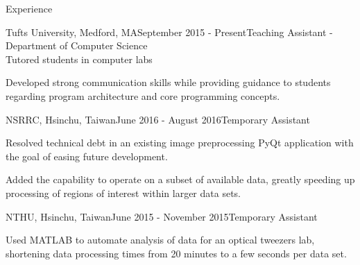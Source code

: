 \documentclass{resume} %
\begin{document}

\bigskip
\bigskip
\bigskip

\begin{rSection}{Experience}


\begin{rSubsection}{Tufts University, Medford, MA}{September 2015 -
    Present}{Teaching Assistant - Department of Computer Science\\
    Tutored students in computer labs}

\item Developed strong communication skills while providing guidance to
    students regarding program architecture and core programming concepts.

\end{rSubsection}

\begin{rSubsection}{NSRRC, Hsinchu, Taiwan}{June 2016 - August 2016}{Temporary
    Assistant}

\item Resolved technical debt in an existing image preprocessing PyQt
    application with the goal of easing future development.

\item Added the capability to operate on a subset of available data, greatly
    speeding up processing of regions of interest within larger data sets.

\end{rSubsection}

\begin{rSubsection}{NTHU, Hsinchu, Taiwan}{June 2015 - November
    2015}{Temporary Assistant}

\item Used MATLAB to automate analysis of data for an optical tweezers lab,
    shortening data processing times from 20 minutes to a few seconds per data
    set.

\end{rSubsection}

\bigskip

\end{rSection}
\end{document}
